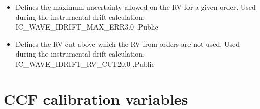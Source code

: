 \begin{itemize}
\item {} 
{Defines the maximum uncertainty allowed on the RV for a given order. Used during the instrumental drift calculation.}
{IC\_WAVE\_IDRIFT\_MAX\_ERR}{3.0}
{\calWAVE}{\constantsfile}{\spirouWAVE.}{Public}

\item {} 
{Defines the RV cut above which the RV from orders are not used. Used during the instrumental drift calculation.}
{IC\_WAVE\_IDRIFT\_RV\_CUT}{20.0}
{\calWAVE}{\constantsfile}{\spirouWAVE.}{Public}


\end{itemize}


\clearpage
\newpage
\section{CCF calibration variables}
\label{ch:variables:ccf}

